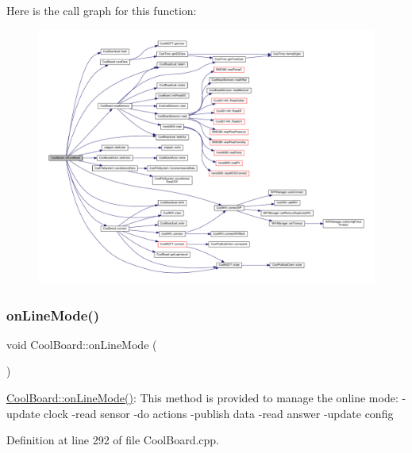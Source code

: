 Here is the call graph for this function\+:
\nopagebreak
\begin{figure}[H]
\begin{center}
\leavevmode
\includegraphics[width=350pt]{d7/df9/class_cool_board_ae6b5e1274d760462290192acea4adca8_cgraph}
\end{center}
\end{figure}
\mbox{\label{class_cool_board_aa0bbc4bc605e35618d18e68795c61363}} 
\subsubsection{\texorpdfstring{on\+Line\+Mode()}{onLineMode()}}
{\footnotesize\ttfamily void Cool\+Board\+::on\+Line\+Mode (\begin{DoxyParamCaption}{ }\end{DoxyParamCaption})}

\hyperlink{class_cool_board_aa0bbc4bc605e35618d18e68795c61363}{Cool\+Board\+::on\+Line\+Mode()}\+: This method is provided to manage the online mode\+: -\/update clock -\/read sensor -\/do actions -\/publish data -\/read answer -\/update config 

Definition at line 292 of file Cool\+Board.\+cpp.


